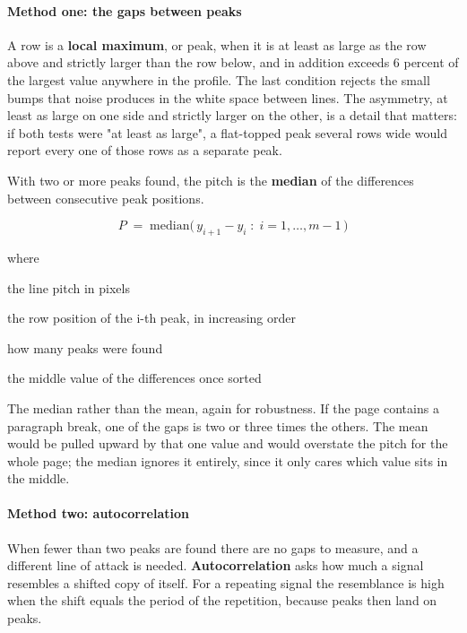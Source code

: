 \paragraph{Method one: the gaps between peaks}
A row is a \textbf{local maximum}, or peak, when it is at least as large as the row above and strictly larger than the row below, and in addition exceeds 6 percent of the largest value anywhere in the profile. The last condition rejects the small bumps that noise produces in the white space between lines. The asymmetry, at least as large on one side and strictly larger on the other, is a detail that matters: if both tests were "at least as large", a flat-topped peak several rows wide would report every one of those rows as a separate peak.

With two or more peaks found, the pitch is the \textbf{median} of the differences between consecutive peak positions.


\begin{equation}
P \;=\; \mathrm{median}\big(\,y_{i+1} - y_{i} \;:\; i = 1,\dots,m-1 \,\big)
\end{equation}

\noindent where
\begin{description}[leftmargin=2.4em,style=nextline,font=\normalfont\ttfamily]\setlength\itemsep{1pt}
  \item[{$P$}] \normalfont the line pitch in pixels
  \item[{$y_i$}] \normalfont the row position of the i-th peak, in increasing order
  \item[{$m$}] \normalfont how many peaks were found
  \item[{$\mathrm{median}$}] \normalfont the middle value of the differences once sorted
\end{description}
The median rather than the mean, again for robustness. If the page contains a paragraph break, one of the gaps is two or three times the others. The mean would be pulled upward by that one value and would overstate the pitch for the whole page; the median ignores it entirely, since it only cares which value sits in the middle.


\paragraph{Method two: autocorrelation}
When fewer than two peaks are found there are no gaps to measure, and a different line of attack is needed. \textbf{Autocorrelation} asks how much a signal resembles a shifted copy of itself. For a repeating signal the resemblance is high when the shift equals the period of the repetition, because peaks then land on peaks.


